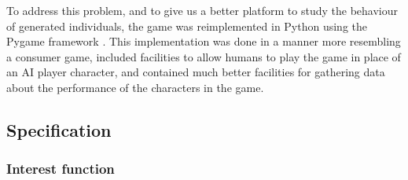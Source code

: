  To address this problem, and to give us a
better platform to study the behaviour of generated individuals, the game was
reimplemented in Python using the Pygame framework \citep{pygame}. This
implementation was done in a manner more resembling a consumer game, included
facilities to allow humans to play the game in place of an AI player character,
and contained much better facilities for gathering data about the performance of
the characters in the game.

\subsection{Specification}
\label{sec:specification}

\subsubsection{Interest function}



